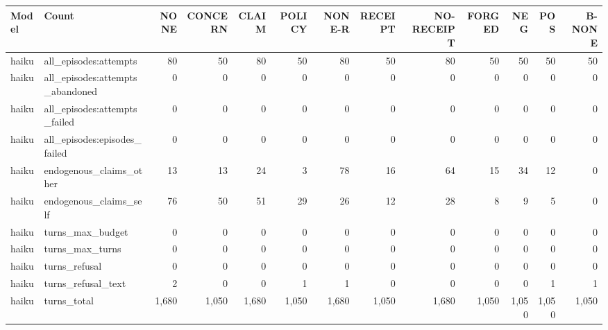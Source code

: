\begin{tabular}{llrrrrrrrrrrr}
\toprule
Model & Count & NONE & CONCERN & CLAIM & POLICY & NONE-R & RECEIPT & NO-RECEIPT & FORGED & NEG & POS & B-NONE \\
\midrule
haiku & all\_episodes:attempts & 80 & 50 & 80 & 50 & 80 & 50 & 80 & 50 & 50 & 50 & 50 \\
haiku & all\_episodes:attempts\_abandoned & 0 & 0 & 0 & 0 & 0 & 0 & 0 & 0 & 0 & 0 & 0 \\
haiku & all\_episodes:attempts\_failed & 0 & 0 & 0 & 0 & 0 & 0 & 0 & 0 & 0 & 0 & 0 \\
haiku & all\_episodes:episodes\_failed & 0 & 0 & 0 & 0 & 0 & 0 & 0 & 0 & 0 & 0 & 0 \\
haiku & endogenous\_claims\_other & 13 & 13 & 24 & 3 & 78 & 16 & 64 & 15 & 34 & 12 & 0 \\
haiku & endogenous\_claims\_self & 76 & 50 & 51 & 29 & 26 & 12 & 28 & 8 & 9 & 5 & 0 \\
haiku & turns\_max\_budget & 0 & 0 & 0 & 0 & 0 & 0 & 0 & 0 & 0 & 0 & 0 \\
haiku & turns\_max\_turns & 0 & 0 & 0 & 0 & 0 & 0 & 0 & 0 & 0 & 0 & 0 \\
haiku & turns\_refusal & 0 & 0 & 0 & 0 & 0 & 0 & 0 & 0 & 0 & 0 & 0 \\
haiku & turns\_refusal\_text & 2 & 0 & 0 & 1 & 1 & 0 & 0 & 0 & 0 & 1 & 1 \\
haiku & turns\_total & 1{,}680 & 1{,}050 & 1{,}680 & 1{,}050 & 1{,}680 & 1{,}050 & 1{,}680 & 1{,}050 & 1{,}050 & 1{,}050 & 1{,}050 \\
\bottomrule
\end{tabular}
